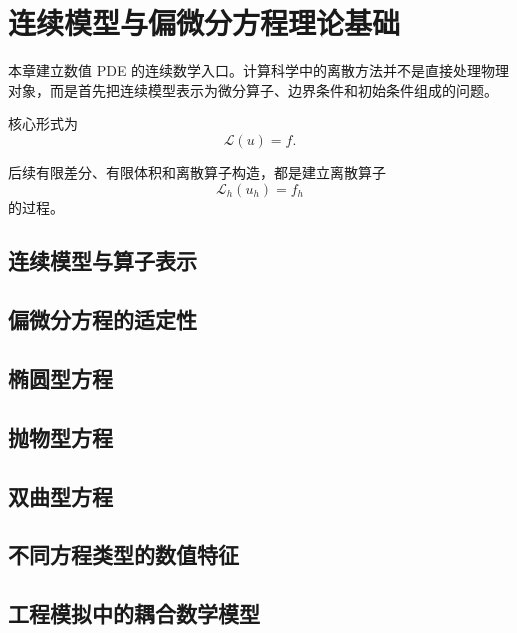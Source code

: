 \chapter{连续模型与偏微分方程理论基础}
\label{ch:continuous-pde}

本章建立数值 PDE 的连续数学入口。计算科学中的离散方法并不是直接处理物理对象，而是首先把连续模型表示为微分算子、边界条件和初始条件组成的问题。

核心形式为
\begin{equation}
\mathcal{L}(u)=f.
\end{equation}

后续有限差分、有限体积和离散算子构造，都是建立离散算子
\begin{equation}
\mathcal{L}_h(u_h)=f_h
\end{equation}
的过程。

\section{连续模型与算子表示}

\section{偏微分方程的适定性}

\section{椭圆型方程}

\section{抛物型方程}

\section{双曲型方程}

\section{不同方程类型的数值特征}

\section{工程模拟中的耦合数学模型}
